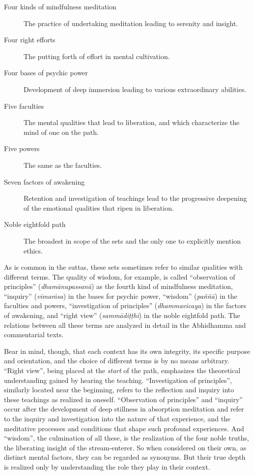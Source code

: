 \documentclass[12pt,openany]{book}%
\begin{document}
\begin{description}%
\item[Four kinds of mindfulness meditation] The practice of undertaking meditation leading to serenity and insight.%
\item[Four right efforts] The putting forth of effort in mental cultivation.%
\item[Four bases of psychic power] Development of deep immersion leading to various extraordinary abilities.%
\item[Five faculties] The mental qualities that lead to liberation, and which characterize the mind of one on the path.%
\item[Five powers] The same as the faculties.%
\item[Seven factors of awakening] Retention and investigation of teachings lead to the progressive deepening of the emotional qualities that ripen in liberation.%
\item[Noble eightfold path] The broadest in scope of the sets and the only one to explicitly mention ethics.%
\end{description}

As is common in the suttas, these sets sometimes refer to similar qualities with different terms. The quality of wisdom, for example, is called “observation of principles” (\textit{\textsanskrit{dhamānupassanā}}) as the fourth kind of mindfulness meditation, “inquiry” (\textit{\textsanskrit{vīmaṁsa}}) in the bases for psychic power, “wisdom” (\textit{\textsanskrit{paññā}}) in the faculties and powers, “investigation of principles” (\textit{dhammavicaya}) in the factors of awakening, and “right view” (\textit{\textsanskrit{sammādiṭṭhi}}) in the noble eightfold path. The relations between all these terms are analyzed in detail in the Abhidhamma and commentarial texts.

Bear in mind, though, that each context has its own integrity, its specific purpose and orientation, and the choice of different terms is by no means arbitrary. “Right view”, being placed at the \emph{start} of the path, emphasizes the theoretical understanding gained by hearing the teaching. “Investigation of principles”, similarly located near the beginning, refers to the reflection and inquiry into these teachings as realized in oneself. “Observation of principles” and “inquiry” occur after the development of deep stillness in absorption meditation and refer to the inquiry and investigation into the nature of that experience, and the meditative processes and conditions that shape such profound experiences. And “wisdom”, the culmination of all these, is the realization of the four noble truths, the liberating insight of the stream-enterer. So when considered on their own, as distinct mental factors, they can be regarded as synonyms. But their true depth is realized only by understanding the role they play in their context.
\end{document}

